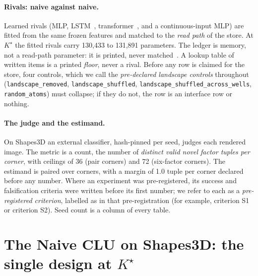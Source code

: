 \documentclass{article} %
\newcommand{\Kstar}{\ensuremath{K^{\star}}}
\begin{document}
\paragraph{Rivals: naive against naive.} Learned rivals (MLP, LSTM~\citep{hochreiter1997long}, transformer~\citep{vaswani2017attention}, and a
continuous-input MLP) are fitted from the same frozen features and matched to the
\emph{read path} of the store. At $\Kstar$ the fitted rivals carry 130,433 to 131,891 parameters.
The ledger is memory, not a read-path parameter: it is printed, never matched~\citep{borgeaud2021improving,khandelwal2020generalization,lample2019large}. A lookup table
of written items is a printed \emph{floor}, never a rival. Before any row is claimed for the
store, four controls, which we call the \emph{pre-declared landscape controls} throughout (\texttt{landscape\_removed}, \texttt{landscape\_shuffled},
\texttt{landscape\_shuffled\_across\_wells}, \texttt{random\_atoms}) must collapse; if they do
not, the row is an interface row or nothing.

\paragraph{The judge and the estimand.} On Shapes3D an external classifier, hash-pinned per seed, judges each rendered image. The metric is a count, the number of \emph{distinct
valid novel factor tuples per corner}, with ceilings of 36 (pair corners) and 72 (six-factor
corners). The estimand is paired over corners, with a margin of 1.0 tuple per corner declared
before any number. %
Where an experiment was pre-registered, its success and falsification criteria were written before
its first number; we refer to each as a \emph{pre-registered criterion}, labelled as in that
pre-registration (for example, criterion S1 or criterion S2).
Seed count is a column of every table.

\section{The Naive CLU on Shapes3D: the single design at $\Kstar$}
\label{sec:shapes}
\end{document}
